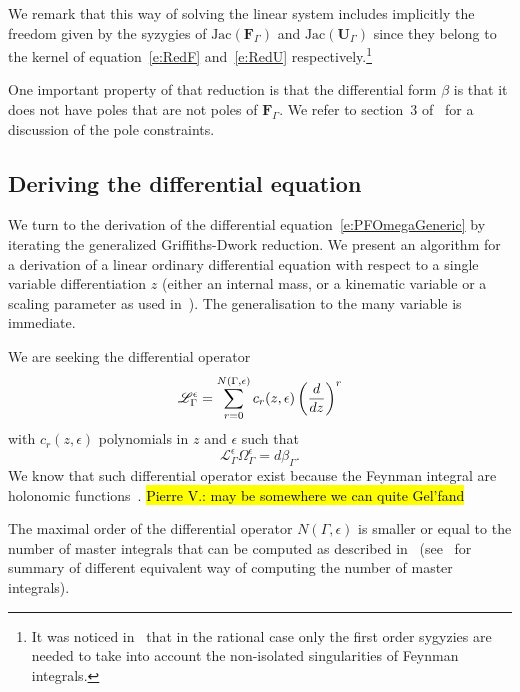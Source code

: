 \documentclass[a4paper,12pt]{article}
\numberwithin{equation}{section}
\numberwithin{figure}{section}
\newcommand{\pvnote}[1]{\sethlcolor{bubblegum} \protect\hl{Pierre V.: #1} \sethlcolor{yellow}}
\begin{document}
We remark that this way of solving the linear system includes implicitly the
freedom given by the syzygies of $\textrm{Jac}(\textbf{F}_\Gamma)$ and
$\textrm{Jac}(\textbf{U}_\Gamma)$ since they belong to
the kernel of equation~\eqref{e:RedF} and~\eqref{e:RedU}
respectively.\footnote{It was noticed in~\cite{Lairez:2022zkj} that in
  the rational case only the first order sygyzies are needed to take
  into account the non-isolated singularities of Feynman integrals.}
%


One important property of that reduction is that the differential form $\beta$ is that it
does not have poles that are not poles of $\textbf{F}_\Gamma$. We refer
to section~3 of~\cite{Lairez:2022zkj} for a discussion of the pole constraints.



\subsection{Deriving the differential equation}
\label{sec:deriv-diff-equat}


We turn to the derivation of the differential
equation~\eqref{e:PFOmegaGeneric}  by iterating the generalized
Griffiths-Dwork reduction. We present an algorithm for a derivation of
a linear ordinary differential equation with respect to a single
variable differentiation $z$ (either an internal mass, or a kinematic
variable or a scaling parameter as used
in~\cite{Lairez:2022zkj,Doran:2023yzu}). The generalisation to the
many variable is immediate.

We are seeking the differential operator 
\begin{equation}\label{e:PFgeneric}
  \mathscr{L}_\Gamma^\epsilon=\sum_{r=0}^{N(\Gamma,\epsilon)}
  c_r(z,\epsilon) \left(d\over dz\right)^r
\end{equation}
with $c_r(z,\epsilon)$ polynomials in $z$ and $\epsilon$ such that
\begin{equation}
     \mathscr{L}_\Gamma^\epsilon \Omega_\Gamma^\epsilon= d\beta_\Gamma.
   \end{equation}
We know that such differential operator exist because the Feynman
integral are holonomic
functions~\cite{Smirnov:2010hn,Bitoun:2017nre,Lee:2013hzt}.
\pvnote{may be somewhere we can quite Gel'fand}


   The maximal order of the differential operator
$N(\Gamma,\epsilon)$ is smaller or equal to the number of master
integrals that can be computed as described
in~\cite{Bitoun:2017nre,Lee:2013hzt} (see~\cite{Agostini:2022cgv} for
summary of different equivalent way of computing the number of master integrals).
\end{document}
